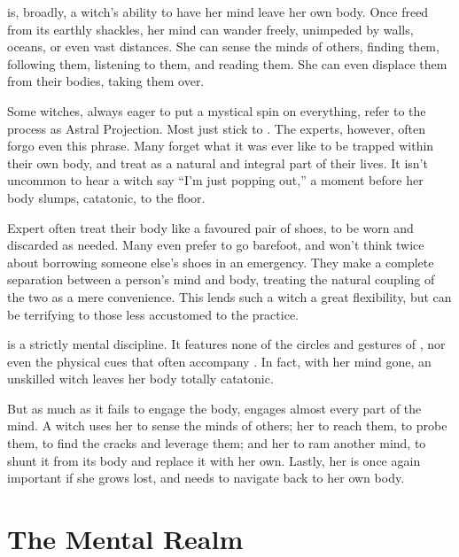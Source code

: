 
 is, broadly, a witch's ability to have her mind leave her own body.
Once freed from its earthly shackles, her mind can wander freely, unimpeded by walls, oceans, or even vast distances.
She can sense the minds of others, finding them, following them, listening to them, and reading them.
She can even displace them from their bodies, taking them over.

Some witches, always eager to put a mystical spin on everything, refer to the process as Astral Projection.
Most just stick to .
The experts, however, often forgo even this phrase.
Many forget what it was ever like to be trapped within their own body, and treat  as a natural and integral part of their lives.
It isn't uncommon to hear a witch say ``I'm just popping out,'' a moment before her body slumps, catatonic, to the floor.

Expert  often treat their body like a favoured pair of shoes, to be worn and discarded as needed.
Many even prefer to go barefoot, and won't think twice about borrowing someone else's shoes in an emergency.
They make a complete separation between a person's mind and body, treating the natural coupling of the two as a mere convenience.
This lends such a witch a great flexibility, but can be terrifying to those less accustomed to the practice.

 is a strictly mental discipline.
It features none of the circles and gestures of , nor even the physical cues that often accompany .
In fact, with her mind gone, an unskilled witch leaves her body totally catatonic.

But as much as it fails to engage the body,  engages almost every part of the mind.
A witch uses her  to sense the minds of others; her  to reach them, to probe them, to find the cracks and leverage them; and her  to ram another mind, to shunt it from its body and replace it with her own.
Lastly, her  is once again important if she grows lost, and needs to navigate back to her own body.

\section{The Mental Realm}

